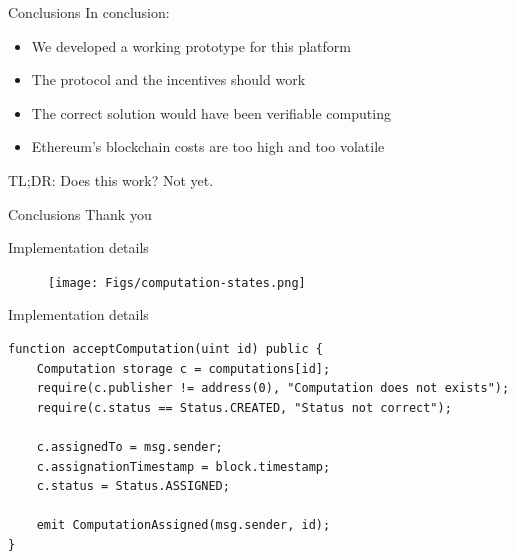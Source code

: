 \documentclass{beamer}
\begin{document}
    \begin{frame}{Conclusions}
        In conclusion:
        \begin{itemize}
            \item We developed a working prototype for this platform
            \item The protocol and the incentives should work
            \item The correct solution would have been verifiable computing
            \item Ethereum's blockchain costs are too high and too volatile
        \end{itemize}
        \centering
        TL;DR: Does this work? Not yet.
    \end{frame}
    \begin{frame}{Conclusions}
        \centering
        Thank you
    \end{frame}

    \begin{frame}{Implementation details}
        \begin{figure}
            \begin{center}
                \texttt{[image: Figs/computation-states.png]}
            \end{center}
        \end{figure}
    \end{frame}
    \begin{frame}[fragile]{Implementation details}
        \begin{center}
            \begin{lstlisting}
function acceptComputation(uint id) public {
    Computation storage c = computations[id];
    require(c.publisher != address(0), "Computation does not exists");
    require(c.status == Status.CREATED, "Status not correct");

    c.assignedTo = msg.sender;
    c.assignationTimestamp = block.timestamp;
    c.status = Status.ASSIGNED;

    emit ComputationAssigned(msg.sender, id);
}
            \end{lstlisting}
        \end{center}
    \end{frame}
\end{document}
